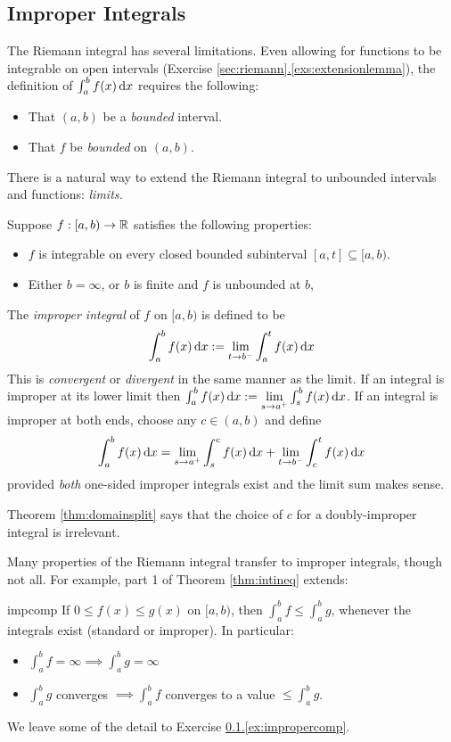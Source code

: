 \setcounter{subsection}{35}
\subsection{Improper Integrals}\label{sec:improper}

The Riemann integral has several limitations. Even allowing for functions to be integrable on open intervals (Exercise \hyperref[exs:extensionlemma]{\ref*{sec:riemann}.\ref*{exs:extensionlemma}}), the definition of $\int_a^bf(x)\,{\mathrm{d} x}$ requires the following:
\begin{itemize}
  \item That $(a,b)$ be a \emph{bounded} interval.
  \item That $f$ be \emph{bounded} on $(a,b)$.
\end{itemize}
There is a natural way to extend the Riemann integral to unbounded intervals and functions: \emph{limits.}

\begin{defn}{}{}
Suppose $f:[a,b)\to\mathbb{R}$ satisfies the following properties:
\begin{itemize}
  \item $f$ is integrable on every closed bounded subinterval $[a,t]\subseteq [a,b)$.
  \item Either $b=\infty$, or $b$ is finite and $f$ is unbounded at $b$,
\end{itemize}
The \emph{improper integral} of $f$ on $[a,b)$ is defined to be
\[\int_a^bf(x)\,{\mathrm{d} x}:=\lim_{t\to b^-}\int_a^tf(x)\,{\mathrm{d} x}\]
This is \emph{convergent} or \emph{divergent} in the same manner as the limit.\smallbreak
If an integral is improper at its lower limit then $\int_a^bf(x)\,{\mathrm{d} x}:=\lim\limits_{s\to a^+}\int_s^bf(x)\,{\mathrm{d} x}$.\smallbreak
If an integral is improper at both ends, choose any $c\in(a,b)$ and define
\[\int_a^bf(x)\,{\mathrm{d} x} =\lim_{s\to a^+}\int_s^cf(x)\,{\mathrm{d} x}+\lim_{t\to b^-}\int_c^tf(x)\,{\mathrm{d} x}\]
provided \emph{both} one-sided improper integrals exist and the limit sum makes sense.
\end{defn}

Theorem \ref{thm:domainsplit} says that the choice of $c$ for a doubly-improper integral is irrelevant.\medbreak

Many properties of the Riemann integral transfer to improper integrals, though not all. For example, part 1 of Theorem \ref{thm:intineq} extends:

\begin{thm}{}{impcomp}
If $0\le f(x)\le g(x)$ on $[a,b)$, then $\int_a^bf\le\int_a^bg$, whenever the integrals exist (standard or improper). In particular:
\begin{itemize}\itemsep2pt
  \item $\int_a^bf=\infty\implies\int_a^bg=\infty$
  \item $\int_a^bg$ converges $\implies \int_a^bf$ converges to a value $\le \int_a^bg$.
\end{itemize}
\end{thm}
We leave some of the detail to Exercise \hyperref[ex:impropercomp]{\ref*{sec:improper}.\ref*{ex:impropercomp}}.

